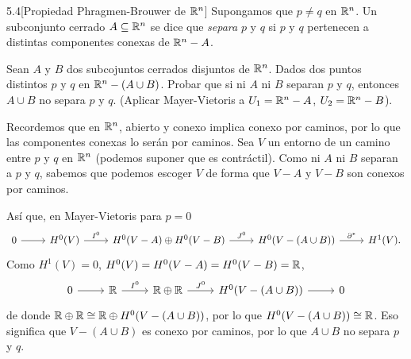\documentclass[twoside]{article}
\begin{document}
\begin{ejercicio}{5.4}[Propiedad Phragmen-Brouwer de $\mathbb{R}^n$]  Supongamos que $p\neq q$ en $\mathbb{R}^n$. Un subconjunto cerrado $A\subseteq\mathbb{R}^n$ se dice que \emph{separa} $p$ y $q$ si $p$ y $q$ pertenecen a distintas componentes conexas de $\mathbb{R}^n-A$. 

Sean $A$ y $B$ dos subcojuntos cerrados disjuntos de $\mathbb{R}^n$. Dados dos puntos distintos $p$ y $q$ en $\mathbb{R}^n-(A\cup B)$. Probar que si ni $A$ ni $B$ separan $p$ y $q$, entonces $A\cup B$ no separa $p$ y $q$. (Aplicar Mayer-Vietoris a $U_1=\mathbb{R}^n-A$, $U_2=\mathbb{R}^n-B$).

\end{ejercicio}
\begin{solucion}
%
Recordemos que en $\mathbb{R}^n$, abierto y conexo implica conexo por caminos, por lo que las componentes conexas lo serán por caminos. Sea $V$ un entorno de un camino entre $p$ y $q$ en $\mathbb{R}^n$ (podemos suponer que es contráctil). Como ni $A$ ni $B$ separan a $p$ y $q$, sabemos que podemos escoger $V$ de forma que $V-A$ y $V-B$ son conexos por caminos. 

Así que, en Mayer-Vietoris para $p=0$
\[
\begin{tikzcd}
0\arrow[r] & H^0(V)\arrow[r,"I^0"] & H^0(V-A)\oplus H^0(V-B)\arrow[r, "J^0"] & H^0(V-(A\cup B))\arrow[r,"\partial^*"] & H^1(V).
\end{tikzcd}
\]
Como $H^1(V)=0$, $H^0(V)=H^0(V-A)=H^0(V-B)=\mathbb{R}$,
\[
\begin{tikzcd}
0\arrow[r] & \R\arrow[r,"I^0"] & \R\oplus \R\arrow[r, "J^0"] & H^0(V-(A\cup B))\arrow[r]& 0
\end{tikzcd}
\]
de donde $\mathbb{R}\oplus\mathbb{R}\cong \mathbb{R}\oplus  H^0(V-(A\cup B))$, por lo que $H^0(V-(A\cup B))\cong\mathbb{R}$. Eso significa que $V-(A\cup B)$ es conexo por caminos, por lo que $A\cup B$ no separa $p$ y $q$. 

%
\end{solucion}
\end{document}
